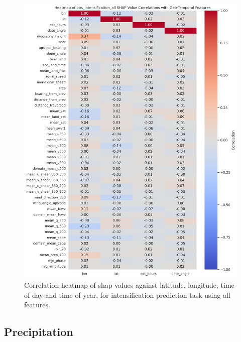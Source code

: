 \begin{figure}[ht]
    \centering
    \includegraphics[width=\textwidth]{../figures/generated/experiments/obs_intensification/obs_intensification_all_shap_correlation_heatmap.png}
    \caption{Correlation heatmap of \acrshort{shap} values against latitude, longitude, time of day and time of year, for intensification prediction task using all features.}
    \label{fig:obs_intensification_all_shap_heatmap}
\end{figure}

\clearpage 

\subsection{Precipitation}
\label{appn:shap-heatmaps-precip}

